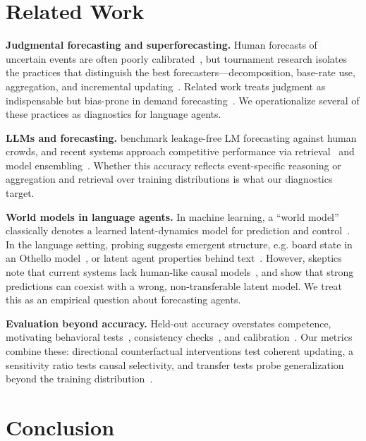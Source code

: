 \documentclass{article} %
\begin{document}
\section{Related Work}
\label{related_work}

\textbf{Judgmental forecasting and superforecasting.}
Human forecasts of uncertain events are often poorly calibrated~\citep{tetlock2005expert}, but tournament research isolates the practices that distinguish the best forecasters---decomposition, base-rate use, aggregation, and incremental updating~\citep{mellers2014psychological,tetlock2016superforecasting}.
Related work treats judgment as indispensable but bias-prone in demand forecasting~\citep{lawrence2006judgmental}.
We operationalize several of these practices as diagnostics for language agents.

\textbf{LLMs and forecasting.}
\citet{zou2022forecasting} benchmark leakage-free LM forecasting against human crowds, and recent systems approach competitive performance via retrieval~\citep{halawi2024approaching} and model ensembling~\citep{schoenegger2024wisdom}.
Whether this accuracy reflects event-specific reasoning or aggregation and retrieval over training distributions is what our diagnostics target.

\textbf{World models in language agents.}
In machine learning, a ``world model'' classically denotes a learned latent-dynamics model for prediction and control~\citep{ha2018world,lecun2022path}.
In the language setting, probing suggests emergent structure, e.g. board state in an Othello model~\citep{li2023emergent}, or latent agent properties behind text~\citep{andreas2022agent}.
However, skeptics note that current systems lack human-like causal models~\citep{mitchell2023ai}, and \citet{vafa2025foundation} show that strong predictions can coexist with a wrong, non-transferable latent model.
We treat this as an empirical question about forecasting agents.

\textbf{Evaluation beyond accuracy.}
Held-out accuracy overstates competence, motivating behavioral tests~\citep{ribeiro2020beyond}, consistency checks~\citep{elazar2021measuring}, and calibration~\citep{brier1950verification}.
Our metrics combine these: directional counterfactual interventions test coherent updating, a sensitivity ratio tests causal selectivity, and transfer tests probe generalization beyond the training distribution~\citep{vafa2025foundation}.


\section{Conclusion}
\end{document}
